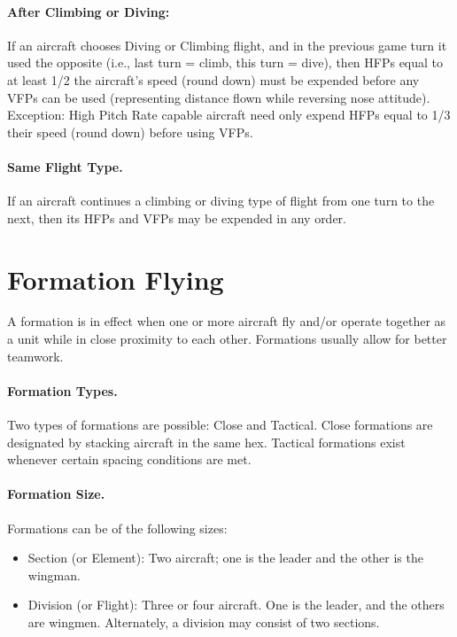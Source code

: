 \begin{advancedrules}
\paragraph{After Climbing or Diving:} 
If an aircraft chooses Diving or Climbing flight, and in the previous game turn it used the opposite (i.e., last turn = climb, this turn = dive), then HFPs equal to at least 1/2 the aircraft's speed (round down) must be expended before any VFPs can be used (representing distance flown while reversing nose attitude). Exception: High Pitch Rate capable aircraft need only expend HFPs equal to 1/3 their speed (round down) before using VFPs.

\paragraph{Same Flight Type.}
If an aircraft continues a climbing or diving type of flight from one turn to the next, then its HFPs and VFPs may be expended in any order.

\section{Formation Flying}
\label{rule:formations}

A formation is in effect when one or more aircraft fly and/or operate together as a unit while in close proximity to each other. Formations usually allow for better teamwork.

\paragraph{Formation Types.} Two types of formations are possible: Close and Tactical. Close formations are designated by stacking aircraft in the same hex. Tactical formations exist whenever certain spacing conditions are met.

\paragraph{Formation Size.} Formations can be of the following sizes:

\begin{itemize}
    \item Section (or Element): Two aircraft; one is the leader and the other is the wingman.
    \item Division (or Flight): Three or four aircraft. One is the leader, and the others are wingmen. Alternately, a division may consist of two sections.
\end{itemize}


\end{advancedrules}
